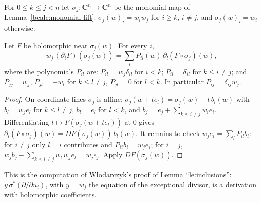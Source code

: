 For \(0\le k\le j<n\) let \(\sigma_j\colon\mathbf C^n\to\mathbf C^n\) be the monomial map of Lemma~\ref{bcalc:monomial-lift}:
\(\sigma_j(w)_i=w_iw_j\) for \(i\ge k\), \(i\ne j\), and \(\sigma_j(w)_i=w_i\) otherwise.

\begin{lemma}
\label{mc:monomial-derivation}
\leanok
Let \(F\) be holomorphic near \(\sigma_j(w)\). For every \(i\),
\[
 w_j\,(\partial_iF)(\sigma_j(w))=\sum_lP_{il}(w)\,\partial_l(F\circ\sigma_j)(w),
\]
where the polynomials \(P_{il}\) are: \(P_{il}=w_j\delta_{il}\) for \(i<k\); \(P_{il}=\delta_{il}\) for \(k\le i\ne j\); and \(P_{jj}=w_j\),
\(P_{jl}=-w_l\) for \(k\le l\ne j\), \(P_{jl}=0\) for \(l<k\). In particular \(P_{ij}=\delta_{ij}w_j\).
\end{lemma}
\begin{proof}
\leanok
On coordinate lines \(\sigma_j\) is affine: \(\sigma_j(w+te_l)=\sigma_j(w)+t\,b_l(w)\) with \(b_l=w_je_l\) for \(k\le l\ne j\), \(b_l=e_l\) for \(l<k\), and
\(b_j=e_j+\sum_{k\le i\ne j}w_ie_i\). Differentiating \(t\mapsto F(\sigma_j(w+te_l))\) at \(0\) gives \(\partial_l(F\circ\sigma_j)(w)=DF(\sigma_j(w))\,b_l(w)\). It
remains to check \(w_je_i=\sum_lP_{il}b_l\): for \(i\ne j\) only \(l=i\) contributes and \(P_{ii}b_i=w_je_i\); for \(i=j\),
\(w_jb_j-\sum_{k\le l\ne j}w_l\,w_je_l=w_je_j\). Apply \(DF(\sigma_j(w))\).
\end{proof}
This is the computation of Włodarczyk's proof of Lemma ``le:inclusions'': \(y\,\sigma^*(\partial/\partial u_i)\), with \(y=w_j\) the equation of the
exceptional divisor, is a derivation with holomorphic coefficients.

